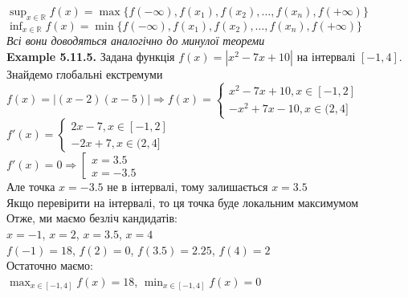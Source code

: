 \documentclass[a4paper, 14pt]{extarticle}
\def\huge{\displaystyle}
\def\bigline{\vspace{5mm}\\}
\def\ex#1{\textbf{Example {#1}}}
\def\bigline{\vspace{5mm}\\}
\begin{document}
$\huge \sup_{x \in \mathbb{R}} f(x) = \max\{f(-\infty),f(x_1),f(x_2),\dots,f(x_n),f(+\infty)\}$\\
$\huge \inf_{x \in \mathbb{R}} f(x) = \min\{f(-\infty),f(x_1),f(x_2),\dots,f(x_n),f(+\infty)\}$\\
\textit{Всі вони доводяться аналогічно до минулої теореми}
\bigline
\ex{5.11.5.} Задана функція $f(x) = |x^2-7x+10|$ на інтервалі $[-1,4]$. Знайдемо глобальні екстремуми\\
$f(x) = |(x-2)(x-5)| \Rightarrow f(x) = \begin{cases} x^2-7x+10, x \in [-1,2] \\ -x^2+7x-10, x \in (2,4] \end{cases}$\\
$f'(x) = \begin{cases} 2x-7, x \in [-1,2] \\ -2x+7, x \in (2,4] \end{cases}$\\
$f'(x) = 0 \Rightarrow \left[ \begin{gathered} x=3.5 \\ x=-3.5 \end{gathered} \right.$\\
Але точка $x=-3.5$ не в інтервалі, тому залишається $x=3.5$\\
Якщо перевірити на інтервалі, то ця точка буде локальним максимумом\\
Отже, ми маємо безліч кандидатів:\\
$x=-1$, $x=2$, $x=3.5$, $x=4$\\
$f(-1) = 18$, $f(2) = 0$, $f(3.5) = 2.25$, $f(4) = 2$\\
Остаточно маємо:\\
$\huge \max_{x \in [-1,4]} f(x) = 18$, $\huge \min_{x \in [-1,4]} f(x) = 0$
\bigline
\end{document}

